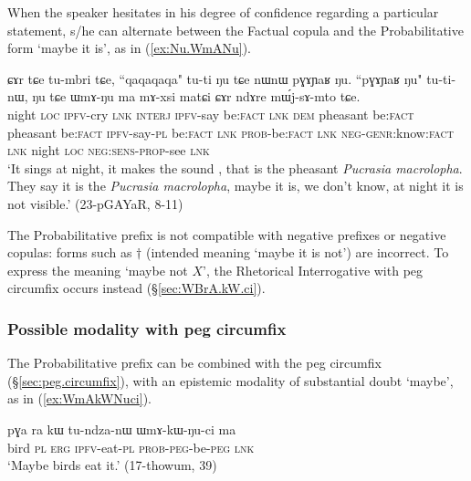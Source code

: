 When the speaker hesitates in his degree of confidence regarding a particular statement, s/he can alternate between the Factual copula  and the Probabilitative form  `maybe it is', as in (\ref{ex:Nu.WmANu}).

 
 \begin{exe}
 \ex \label{ex:Nu.WmANu}
\gll ɕɤr tɕe tu-mbri tɕe, ``qaqaqaqa" tu-ti ŋu tɕe nɯnɯ pɣɤɲaʁ ŋu. ``pɣɤɲaʁ ŋu" tu-ti-nɯ, ŋu tɕe ɯmɤ-ŋu ma mɤ-xsi matɕi ɕɤr ndɤre mɯ́j-sɤ-mto tɕe. \\
night \textsc{loc} \textsc{ipfv}-cry \textsc{lnk} \textsc{interj} \textsc{ipfv}-say be:\textsc{fact} \textsc{lnk} \textsc{dem} pheasant be:\textsc{fact} pheasant be:\textsc{fact} \textsc{ipfv}-say-\textsc{pl} be:\textsc{fact} \textsc{lnk} \textsc{prob}-be:\textsc{fact} \textsc{lnk} \textsc{neg}-\textsc{genr}:know:\textsc{fact} \textsc{lnk} night \textsc{loc} \textsc{neg}:\textsc{sens}-\textsc{prop}-see \textsc{lnk} \\
\glt `It sings at night, it makes the sound , that is the pheasant \textit{Pucrasia macrolopha}. They say it is the \textit{Pucrasia macrolopha}, maybe it is, we don't know, at night it is not visible.' (23-pGAYaR, 8-11)
 \end{exe}
 
The Probabilitative prefix is not compatible with negative prefixes or negative copulas: forms such as $\dagger$ (intended meaning `maybe it is not') are incorrect. To express the meaning `maybe not $X$', the Rhetorical Interrogative  with peg circumfix occurs instead (§\ref{sec:WBrA.kW.ci}).
 
\subsubsection{Possible modality with peg circumfix} \label{sec:WmA.kW.ci}
The Probabilitative prefix can be combined with the peg circumfix (§\ref{sec:peg.circumfix}), with an epistemic modality of substantial doubt  `maybe', as in (\ref{ex:WmAkWNuci}).

\begin{exe}
\ex \label{ex:WmAkWNuci}
\gll pɣa ra kɯ tu-ndza-nɯ ɯmɤ-kɯ-ŋu-ci ma \\
bird \textsc{pl} \textsc{erg} \textsc{ipfv}-eat-\textsc{pl}  \textsc{prob}-\textsc{peg}-be-\textsc{peg} \textsc{lnk} \\
\glt `Maybe birds eat it.' (17-thowum, 39)
\end{exe}

